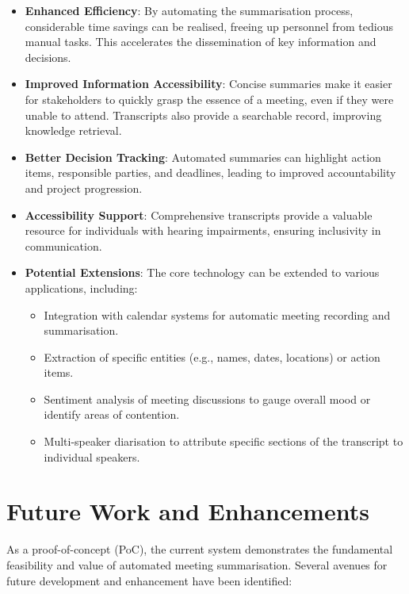 \documentclass{article}
\begin{document}
\begin{itemize}
    \item \textbf{Enhanced Efficiency}: By automating the summarisation process, considerable time savings can be realised, freeing up personnel from tedious manual tasks. This accelerates the dissemination of key information and decisions.
    \item \textbf{Improved Information Accessibility}: Concise summaries make it easier for stakeholders to quickly grasp the essence of a meeting, even if they were unable to attend. Transcripts also provide a searchable record, improving knowledge retrieval.
    \item \textbf{Better Decision Tracking}: Automated summaries can highlight action items, responsible parties, and deadlines, leading to improved accountability and project progression.
    \item \textbf{Accessibility Support}: Comprehensive transcripts provide a valuable resource for individuals with hearing impairments, ensuring inclusivity in communication.
\item \textbf{Potential Extensions}: The core technology can be extended to various applications, including:
    \begin{itemize}
        \item Integration with calendar systems for automatic meeting recording and summarisation.
        \item Extraction of specific entities (e.g., names, dates, locations) or action items.
        \item Sentiment analysis of meeting discussions to gauge overall mood or identify areas of contention.
        \item Multi-speaker diarisation to attribute specific sections of the transcript to individual speakers.
    \end{itemize}
\end{itemize}

\section{Future Work and Enhancements}
As a proof-of-concept (PoC), the current system demonstrates the fundamental feasibility and value of automated meeting summarisation. Several avenues for future development and enhancement have been identified:
\end{document}
